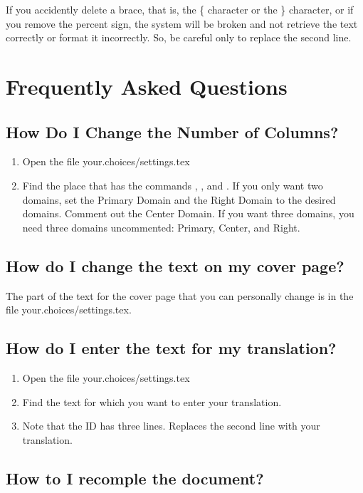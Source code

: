 \documentclass[]{memoir}
\begin{document}
\begin{warning}
If you accidently delete a brace, that is, the \{ character or the \} character, or if you remove the percent sign, the system will be broken and not retrieve the text correctly or format it incorrectly.  So, be careful only to replace the second line.
\end{warning}

\chapter{Frequently Asked Questions}
\section{How Do I Change the Number of Columns?}
\begin{enumerate}
\item Open the file your.choices/settings.tex
\item Find the place that has the commands , , and .  If you only want two domains, set the Primary Domain and the Right Domain to the desired domains.  Comment out the Center Domain.  If you want three domains, you need three domains uncommented: Primary, Center, and Right.
\end{enumerate}
\section{How do I change the text on my cover page?}
The part of the text for the cover page that you can personally change is in the file your.choices/settings.tex.

\section{How do I enter the text for my translation?}
\begin{enumerate}
\item Open the file your.choices/settings.tex
\item Find the text for which you want to enter your translation.
\item Note that the ID has three lines.  Replaces the second line with your translation.
\end{enumerate}

\section{How to I recomple the document?}
\end{document}
